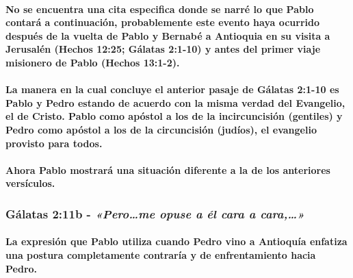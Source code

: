 \documentclass[11a pt,twoside]{article}
\newcommand{\scripture}[1]{%
  {\fontsize{12pt}{16pt}\selectfont\ScriptureFont\itshape #1}%
}
\let\oldsubsubsection\subsubsection
\renewcommand{\subsubsection}{\needspace{4\baselineskip}\oldsubsubsection}
\let\oldparagraph\paragraph
\renewcommand{\paragraph}{\needspace{3\baselineskip}\oldparagraph}
\begin{document}
\paragraph{No se encuentra una cita especifica donde se narré lo que
Pablo contará a continuación, probablemente este evento haya ocurrido
después de la vuelta de Pablo y Bernabé a Antioquia en su visita a
Jerusalén (Hechos 12:25; Gálatas 2:1-10) y antes del primer viaje
misionero de Pablo (Hechos
13:1-2).}\label{no-se-encuentra-una-cita-especifica-donde-se-narruxe9-lo-que-pablo-contaruxe1-a-continuaciuxf3n-probablemente-este-evento-haya-ocurrido-despuuxe9s-de-la-vuelta-de-pablo-y-bernabuxe9-a-antioquia-en-su-visita-a-jerusaluxe9n-hechos-1225-guxe1latas-21-10-y-antes-del-primer-viaje-misionero-de-pablo-hechos-131-2.}

\paragraph{La manera en la cual concluye el anterior pasaje de Gálatas
2:1-10 es Pablo y Pedro estando de acuerdo con la misma verdad del
Evangelio, el de Cristo. Pablo como apóstol a los de la incircuncisión
(gentiles) y Pedro como apóstol a los de la circuncisión (judíos), el
evangelio provisto para
todos.}\label{la-manera-en-la-cual-concluye-el-anterior-pasaje-de-guxe1latas-21-10-es-pablo-y-pedro-estando-de-acuerdo-con-la-misma-verdad-del-evangelio-el-de-cristo.-pablo-como-apuxf3stol-a-los-de-la-incircuncisiuxf3n-gentiles-y-pedro-como-apuxf3stol-a-los-de-la-circuncisiuxf3n-juduxedos-el-evangelio-provisto-para-todos.}

\paragraph{Ahora Pablo mostrará una situación diferente a la de los
anteriores
versículos.}\label{ahora-pablo-mostraruxe1-una-situaciuxf3n-diferente-a-la-de-los-anteriores-versuxedculos.}

\subsubsection{\texorpdfstring{Gálatas 2:11b -
\scripture{«Pero…me opuse a él cara a cara,…»}}{Gálatas 2:11b - }}\label{guxe1latas-211b---perome-opuse-a-uxe9l-cara-a-cara}

\paragraph{La expresión que Pablo utiliza cuando Pedro vino a Antioquía
enfatiza una postura completamente contraría y de enfrentamiento hacia
Pedro.}\label{la-expresiuxf3n-que-pablo-utiliza-cuando-pedro-vino-a-antioquuxeda-enfatiza-una-postura-completamente-contraruxeda-y-de-enfrentamiento-hacia-pedro.}
\end{document}
